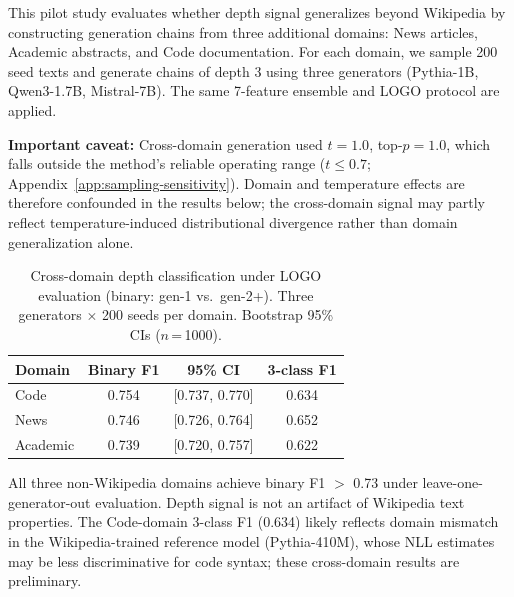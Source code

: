 This pilot study evaluates whether depth signal generalizes beyond Wikipedia by constructing generation chains from three additional domains: News articles, Academic abstracts, and Code documentation.
For each domain, we sample 200 seed texts and generate chains of depth 3 using three generators (Pythia-1B, Qwen3-1.7B, Mistral-7B).
The same 7-feature ensemble and LOGO protocol are applied.

\noindent\textbf{Important caveat:} Cross-domain generation used $t{=}1.0$, top-$p{=}1.0$, which falls outside the method's reliable operating range ($t \leq 0.7$; Appendix~\ref{app:sampling-sensitivity}). Domain and temperature effects are therefore confounded in the results below; the cross-domain signal may partly reflect temperature-induced distributional divergence rather than domain generalization alone.

\begin{table}[ht]
\centering
\small
\caption{Cross-domain depth classification under LOGO evaluation (binary: gen-1 vs.\ gen-2+). Three generators $\times$ 200 seeds per domain. Bootstrap 95\% CIs ($n$\,=\,1000).}
\label{tab:domain}
\begin{tabular}{lccc}
\toprule
\textbf{Domain} & \textbf{Binary F1} & \textbf{95\% CI} & \textbf{3-class F1} \\
\midrule
Code           & 0.754 & [0.737, 0.770] & 0.634 \\
News           & 0.746 & [0.726, 0.764] & 0.652 \\
Academic       & 0.739 & [0.720, 0.757] & 0.622 \\
\bottomrule
\end{tabular}
\end{table}

All three non-Wikipedia domains achieve binary F1 $>$ 0.73 under leave-one-generator-out evaluation. Depth signal is not an artifact of Wikipedia text properties.
The Code-domain 3-class F1 (0.634) likely reflects domain mismatch in the Wikipedia-trained reference model (Pythia-410M), whose NLL estimates may be less discriminative for code syntax; these cross-domain results are preliminary.

